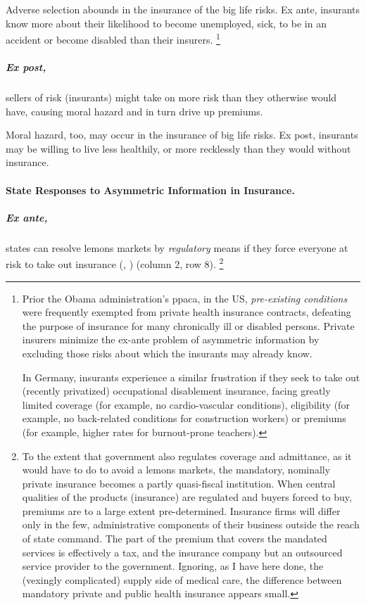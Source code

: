 Adverse selection abounds in the insurance of the big life risks.
Ex ante, insurants know more about their likelihood to become unemployed, sick, to be in an accident or become disabled than their insurers.
\footnote{
	Prior the Obama administration's \gls{ppaca}, in the US, \emph{pre-existing conditions} were frequently exempted from private health insurance contracts, defeating the purpose of insurance for many chronically ill or disabled persons.
	Private insurers minimize the ex-ante problem of asymmetric information by excluding those risks about which the insurants may already know.

	In Germany, insurants experience a similar frustration if they seek to take out (recently privatized) occupational disablement insurance, facing greatly limited coverage (for example, no cardio-vascular conditions), eligibility (for example, no back-related conditions for construction workers) or premiums (for example, higher rates for burnout-prone teachers).
}

\subparagraph[Moral Hazard]{Ex post,}
	\label{sec:moral-hazard}
sellers of risk (insurants) might take on more risk than they otherwise would have, causing moral hazard and in turn drive up premiums.

Moral hazard, too, may occur in the insurance of big life risks.
Ex post, insurants may be willing to live less healthily, or more recklessly than they would without insurance.

\paragraph{State Responses to Asymmetric Information in Insurance.}
	\label{sec:state-insurance}

\subparagraph{Ex ante,}
states can resolve lemons markets by \emph{regulatory} means if they force everyone at risk to take out insurance (\citealt{Akerlof-1970-aa}, \citealt{Barr})
(column 2, row 8).
\footnote{
	To the extent that government also regulates coverage and admittance, as it would have to do to avoid a lemons markets, the mandatory, nominally private insurance becomes a partly quasi-fiscal institution.
	When central qualities of the products (insurance) are regulated and buyers forced to buy, premiums are to a large extent pre-determined.
	Insurance firms will differ only in the few, administrative components of their business outside the reach of state command.
	The part of the premium that covers the mandated services is effectively a tax, and the insurance company but an outsourced service provider to the government.
	Ignoring, as I have here done, the (vexingly complicated) supply side of medical care, the difference between mandatory private and public health insurance appears small.
}

